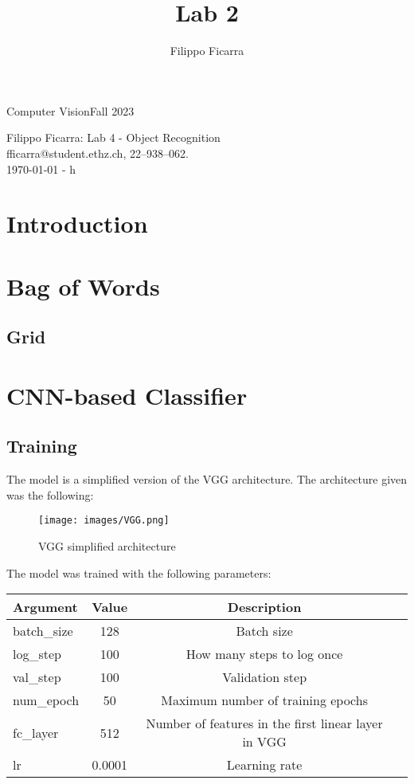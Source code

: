 \documentclass{ETHExercise}
\title{Lab 2}
\author{Filippo Ficarra}
\newcommand{\timestamp}{\ddmmyyyydate\today \,\,- \currenttime h}
\begin{document}
{}
{\Large Computer Vision}{Fall 2023}
\begin{center}
    {\Huge Filippo Ficarra: Lab 4 - Object Recognition}\\
      \quad\newline
      fficarra@student.ethz.ch, 22--938--062.\\
      \quad\newline
      \timestamp
      \end{center}

\section{Introduction}

\section{Bag of Words}
\subsection{Grid}
\section{CNN-based Classifier}

\subsection{Training}
The model is a simplified version of the VGG architecture. The architecture given was
the following:

\begin{figure}[!h]
  \centering
  \texttt{[image: images/VGG.png]}
  \caption{VGG simplified architecture}
\end{figure}

The model was trained with the following parameters:
\begin{center}
  \begin{tabular}{|l|c|c|c|}
    \hline
    \textbf{Argument} & \textbf{Value} &  \textbf{Description} \\
    \hline
    batch\_size & 128 & Batch size \\
    log\_step & 100 & How many steps to log once \\
    val\_step & 100 &  Validation step \\
    num\_epoch & 50 & Maximum number of training epochs \\
    fc\_layer & 512 & Number of features in the first linear layer in VGG \\
    lr & 0.0001 &  Learning rate \\
    \hline
  \end{tabular}
\end{center}
\end{document}
